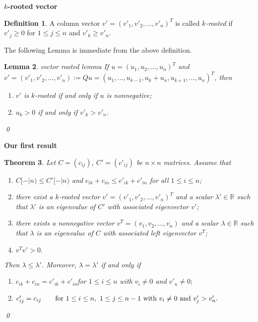 \documentclass{beamer}
\theoremstyle{plain}
\newtheorem{thm}{Theorem}[section]
\newtheorem{lem}[thm]{Lemma}
\theoremstyle{definition}
\newtheorem{defn}[thm]{Definition}
\begin{document}
\begin{frame}{\bf $k$-rooted vector}

\begin{defn}
 A column vector $v'=(v'_1,v'_2,\ldots,v'_n)^T$ is called {\it $k$-rooted}  if $v'_{j} \geq 0$ for $1 \leq  j \leq n$ and $v'_k\geq v'_n.$
\end{defn}
\bigskip

The following Lemma is immediate from the above definition.
\bigskip

\begin{lem}{vector rooted lemma}
If $u=(u_1, u_2, \ldots, u_n)^T$ and $v'=(v'_1, v'_2, \ldots, v'_n):=Qu=(u_1,\ldots, u_{k-1},u_k+u_n, u_{k+1}, \ldots,  u_n)^T$, then
\begin{enumerate}
\item[(i)] $v'$ is $k$-rooted  if and only if  $u$ is nonnegative;
\item[(ii)] $u_k>0$ if and only if $v'_k>v'_n$.
\end{enumerate}
\qed
\end{lem}

\end{frame}

\begin{frame}{\bf Our first result}

\begin{thm} \label{thm_main}
    Let $C=(c_{ij})$, $C'=(c'_{ij})$ be  $n\times n$ matrices.
Assume that
\begin{enumerate}
\item[(i)]   $C[-|n)\leq C'[-|n)$ and $c_{ik}+c_{in}\leq c'_{ik}+c'_{in}$ for all $1\leq i\leq n$;
\item[(ii)] there exist a $k$-rooted vector $v'=(v'_1, v'_2, \ldots, v'_n)^T$ and a scalar $\lambda'\in \mathbb{R}$
such that $\lambda'$ is an eigenvalue of $C'$ with associated eigenvector $v'$;
\item[(iii)] there exists a nonnegative vector $v^T=(v_1, v_2, \ldots, v_n)$ and a scalar $\lambda\in \mathbb{R}$ such that $\lambda$ is an eigenvalue of $C$ with associated left eigenvector $v^T$;
\item[(iv)] $v^Tv'>0.$
\end{enumerate}
 Then $\lambda\leq \lambda'$.
Moreover, $\lambda=\lambda'$
if and only if
\begin{enumerate}
\item[(a)] $c_{ik}+c_{in}=c'_{ik}+c'_{in}$\qquad for $1\leq i\leq n$ with $v_i\not=0$ and $v'_n\not=0;$
\item[(b)]
$c'_{ij}=c_{ij}\qquad \hbox{for~}1\leq i\leq n,~1\leq j\leq n-1 \hbox{~with~} v_i\ne 0 \hbox{~and~} v'_j> v'_n.$
\end{enumerate} \qed
\end{thm}
\end{frame}
\end{document}
